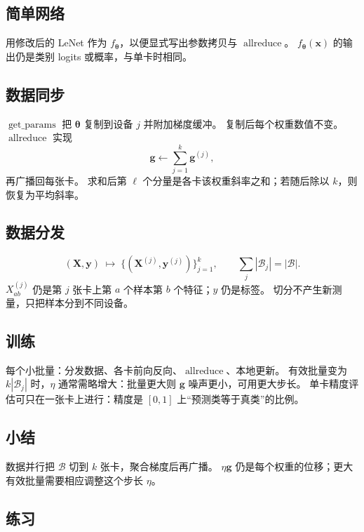 \subsection{简单网络}

用修改后的 LeNet 作为 $f_{\bm{\theta}}$，以便显式写出参数拷贝与 $\operatorname{allreduce}$。
$f_{\bm{\theta}}(\bm{x})$ 的输出仍是类别 logits 或概率，与单卡时相同。

\subsection{数据同步}

$\operatorname{get\_params}$ 把 $\bm{\theta}$ 复制到设备 $j$ 并附加梯度缓冲。
复制后每个权重数值不变。
$\operatorname{allreduce}$ 实现
\[
\bm{g}\leftarrow\sum_{j=1}^{k}\bm{g}^{(j)},
\]
再广播回每张卡。
求和后第 $\ell$ 个分量是各卡该权重斜率之和；若随后除以 $k$，则恢复为平均斜率。

\subsection{数据分发}

\[
(\bm{X},\bm{y})
\;\longmapsto\;
\bigl\{(\bm{X}^{(j)},\bm{y}^{(j)})\bigr\}_{j=1}^{k},
\qquad
\sum_j|\mathcal{B}_j|=|\mathcal{B}|.
\]
$X^{(j)}_{ab}$ 仍是第 $j$ 张卡上第 $a$ 个样本第 $b$ 个特征；$y$ 仍是标签。
切分不产生新测量，只把样本分到不同设备。

\subsection{训练}

每个小批量：分发数据、各卡前向反向、$\operatorname{allreduce}$、本地更新。
有效批量变为 $k|\mathcal{B}_j|$ 时，$\eta$ 通常需略增大：批量更大则 $\bm{g}$ 噪声更小，可用更大步长。
单卡精度评估可只在一张卡上进行：精度是 $[0,1]$ 上“预测类等于真类”的比例。

\subsection{小结}

数据并行把 $\mathcal{B}$ 切到 $k$ 张卡，聚合梯度后再广播。
$\eta\bm{g}$ 仍是每个权重的位移；更大有效批量需要相应调整这个步长 $\eta$。

\subsection{练习}

